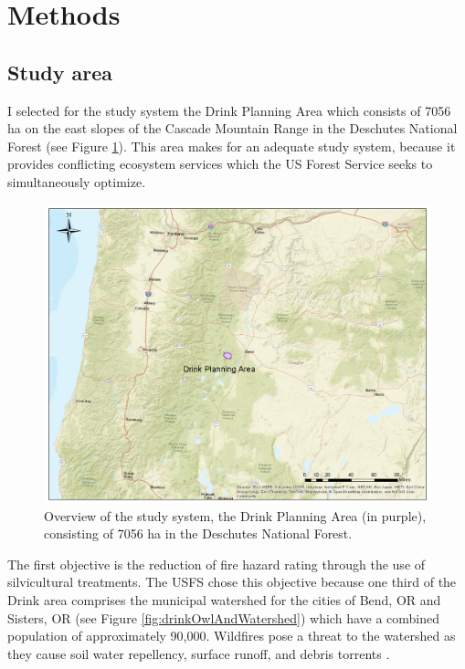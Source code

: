 \section{Methods}
\subsection{Study area}
\label{subsec:studyArea}
I selected for the study system the Drink Planning Area which consists of 7056 ha on the east slopes of the Cascade Mountain Range in the Deschutes National Forest (see Figure \ref{fig:drinkOverview}). This area makes for an adequate study system, because it provides conflicting ecosystem services which the US Forest Service seeks to simultaneously optimize.

\begin{figure}[ht]
\centering
\includegraphics[width=.85\textwidth]{../images/DrinkMap_Overview}
\caption[Overview of the study system, the Drink Planning Area]{Overview of the study system, the Drink Planning Area (in purple), consisting of 7056 ha in the Deschutes National Forest.}
\label{fig:drinkOverview}
\end{figure}

The first objective is the reduction of fire hazard rating through the use of silvicultural treatments. The USFS chose this objective because one third of the Drink area comprises the municipal watershed for the cities of Bend, OR and Sisters, OR (see Figure \ref{fig:drinkOwlAndWatershed}) which have a combined population of approximately 90,000. Wildfires pose a threat to the watershed as they cause soil water repellency, surface runoff, and debris torrents \cite{ice2004effects}.

